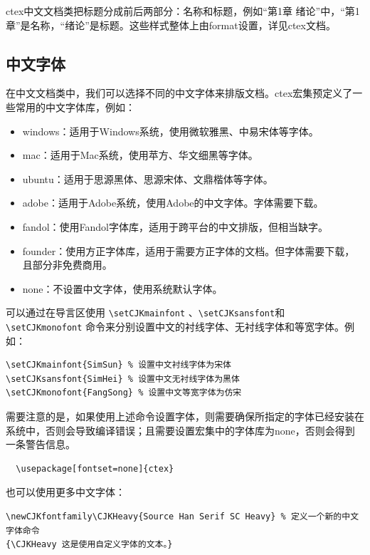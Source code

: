 ctex中文文档类把标题分成前后两部分：名称和标题，例如“第1章 绪论”中，“第1章”是名称，“绪论”是标题。这些样式整体上由format设置，详见ctex文档。

\subsection{中文字体}

在中文文档类中，我们可以选择不同的中文字体来排版文档。ctex宏集预定义了一些常用的中文字体库，例如：
\begin{itemize}
  \item windows：适用于Windows系统，使用微软雅黑、中易宋体等字体。
  \item mac：适用于Mac系统，使用苹方、华文细黑等字体。
  \item ubuntu：适用于思源黑体、思源宋体、文鼎楷体等字体。
  \item adobe：适用于Adobe系统，使用Adobe的中文字体。字体需要下载。
  \item fandol：使用Fandol字体库，适用于跨平台的中文排版，但相当缺字。
  \item founder：使用方正字体库，适用于需要方正字体的文档。但字体需要下载，且部分非免费商用。
  \item none：不设置中文字体，使用系统默认字体。
\end{itemize}

可以通过在导言区使用 \verb|\setCJKmainfont| 、\verb|\setCJKsansfont|和 \verb|\setCJKmonofont| 命令来分别设置中文的衬线字体、无衬线字体和等宽字体。例如：
\begin{verbatim}
\setCJKmainfont{SimSun} % 设置中文衬线字体为宋体
\setCJKsansfont{SimHei} % 设置中文无衬线字体为黑体
\setCJKmonofont{FangSong} % 设置中文等宽字体为仿宋
\end{verbatim}
需要注意的是，如果使用上述命令设置字体，则需要确保所指定的字体已经安装在系统中，否则会导致编译错误；且需要设置宏集中的字体库为none，否则会得到一条警告信息。
\begin{verbatim}
  \usepackage[fontset=none]{ctex}
\end{verbatim}


也可以使用更多中文字体：
\begin{verbatim}
\newCJKfontfamily\CJKHeavy{Source Han Serif SC Heavy} % 定义一个新的中文字体命令
{\CJKHeavy 这是使用自定义字体的文本。}
\end{verbatim}
